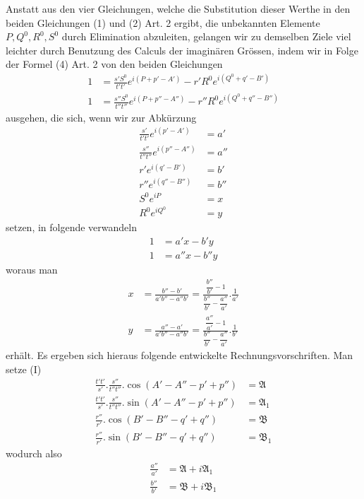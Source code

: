 \noindent Anstatt aus den vier Gleichungen, welche die Substitution dieser Werthe in den beiden Gleichungen (1) und (2) Art. 2 ergibt, die unbekannten Elemente $P,Q^0,R^0,S^0$ durch Elimination abzuleiten, gelangen wir zu demselben Ziele viel leichter durch Benutzung des Calculs der imaginären Grössen, indem wir in Folge der Formel (4) Art. 2 von den beiden Gleichungen
\[
\begin{aligned}
1&=\frac{s'S^0}{t't'}e^{i(P+p'-A')}-r'R^0e^{i(Q^0+q'-B')}\\
1&=\frac{s''S^0}{t''t''}e^{i(P+p''-A'')}-r''R^0e^{i(Q^0+q''-B'')}
\end{aligned}
\]
ausgehen, die sich, wenn wir zur Abkürzung
\[
\begin{aligned}
\frac{s'}{t't'}e^{i(p'-A')}&=a'\\
\frac{s''}{t''t''}e^{i(p''-A'')}&=a''\\
r'e^{i(q'-B')}&=b'\\
r''e^{i(q''-B'')}&=b''\\
S^0e^{iP}&=x\\
R^0e^{iQ^0}&=y
\end{aligned}
\]
setzen, in folgende verwandeln
\[
\begin{aligned}
1&=a'x-b'y\\
1&=a''x-b''y
\end{aligned}
\]
woraus man
\[
\begin{aligned}
x&=\frac{b''-b'}{a'b''-a''b'}=\frac{\dfrac{b''}{b'}-1}{\dfrac{b''}{b'}-\dfrac{a''}{a'}}.\frac{1}{a'}\\[1ex]
y&=\frac{a''-a'}{a'b''-a''b'}=\frac{\dfrac{a''}{a'}-1}{\dfrac{b''}{b'}-\dfrac{a''}{a'}}.\frac{1}{b'}
\end{aligned}
\]
erhält. Es ergeben sich hieraus folgende entwickelte Rechnungsvorschriften. Man setze (I)
\[
\begin{aligned}
\frac{t't'}{s'}.\frac{s''}{t''t''}.\cos(A'-A''-p'+p'')&=\mathfrak{A}\\
\frac{t't'}{s'}.\frac{s''}{t''t''}.\sin(A'-A''-p'+p'')&=\mathfrak{A}_1\\
\frac{r''}{r'}.\cos(B'-B''-q'+q'')&=\mathfrak{B}\\
\frac{r''}{r'}.\sin(B'-B''-q'+q'')&=\mathfrak{B}_1
\end{aligned}
\]
wodurch also
\[
\begin{aligned}
\frac{a''}{a'}&=\mathfrak{A}+i\mathfrak{A}_1\\
\frac{b''}{b'}&=\mathfrak{B}+i\mathfrak{B}_1
\end{aligned}
\]
